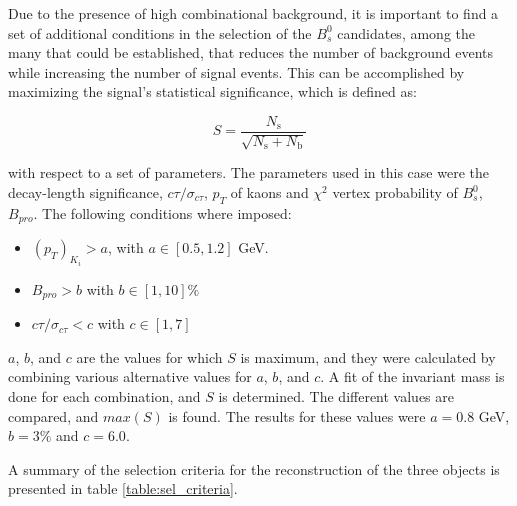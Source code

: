 Due to the presence of high combinational background, it is important to find a set of additional conditions in the selection of the $B^0_s$ candidates, among the many that could be established, that reduces the number of background events while increasing the number of signal events. This can be accomplished by maximizing the signal's statistical significance, which is defined as:

\begin{equation}
	\label{eq:sig}
	S = \frac{N_{\text{s}}}{\sqrt{N_{\text{s}} + N_{\text{b}}}}
\end{equation}

with respect to a set of parameters. The parameters used in this case were the decay-length significance, $c\tau / \sigma_{c\tau}$, $p_T$ of kaons and $\chi^2$ vertex probability of $B^0_s$, $B_{pro}$. The following conditions where imposed:

\begin{itemize}
	\item  $(p_T)_{K_i} > a$, with $a \in [0.5, 1.2]$ GeV.
	\item $B_{pro} > b$ with $b \in [1, 10] \%$ 
	\item $c\tau / \sigma_{c\tau} < c$ with $c \in [1, 7]$
\end{itemize}

$a$, $b$, and $c$ are the values for which $S$ is maximum, and they were calculated by combining various alternative values for $a$, $b$, and $c$. A fit of the invariant mass is done for each combination, and $S$ is determined. The different values are compared, and $max(S)$ is found. The results for these values were $a = 0.8$ GeV, $b = 3\%$ and $c = 6.0$.

A summary of the selection criteria for the reconstruction of the three objects is presented in table \ref{table:sel_criteria}.

